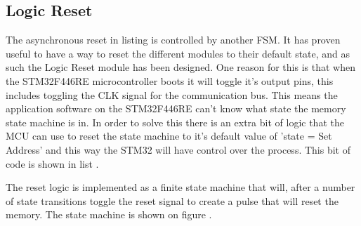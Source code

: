 \subsection*{Logic Reset}
The asynchronous reset in listing  is controlled by another FSM. It has proven useful to have a way to reset the different modules to their default state, and as such the Logic Reset module has been designed. One reason for this is that when the STM32F446RE microcontroller boots it will toggle it's output pins, this includes toggling the CLK signal for the communication bus. This means the application software on the STM32F446RE can't know what state the memory state machine is in. In order to solve this there is an extra bit of logic that the MCU can use to reset the state machine to it's default value of 'state = Set Address' and this way the STM32 will have control over the process. This bit of code is shown in list . 



The reset logic is implemented as a finite state machine that will, after a number of state transitions toggle the reset signal to create a pulse that will reset the memory. The state machine is shown on figure . 

